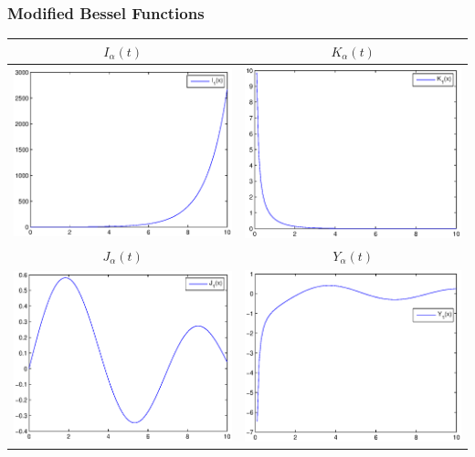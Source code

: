 	
	\begin{frame}
		\frametitle{Modified Bessel Functions}
		\centering
		\begin{tabular}{|c|c|}\hline
		$I_\alpha(t)$&$K_\alpha(t)$\\\hline
		\includegraphics[width=.40\textwidth]{Bessel/BesselI.eps}&\includegraphics[width=.40\textwidth]{Bessel/BesselK.eps}\\\hline
		$J_\alpha(t)$&$Y_\alpha(t)$\\\hline
		\includegraphics[width=.40\textwidth]{Bessel/BesselJ.eps}&\includegraphics[width=.40\textwidth]{Bessel/BesselY.eps}\\\hline
		\end{tabular}\\
	\end{frame}
	
